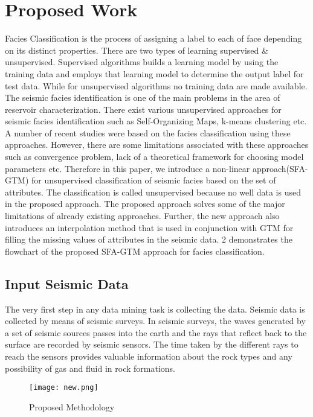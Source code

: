 \documentclass[a4paper]{article}
\begin{document}
\section{Proposed Work}
Facies Classification is the process of assigning a label to each of face depending on its distinct properties. There are two types of learning\cite{ml} supervised \& unsupervised. Supervised algorithms\cite{ml} builds a learning model by using the training data and employs that learning model to determine the output label for test data. While for unsupervised algorithms\cite{ml} no training data are made available. The seismic facies identification is one of the main problems in the area of reservoir characterization. There exist various unsupervised approaches for seismic facies identification such as Self-Organizing Maps, k-means clustering etc. A number of recent studies were based on the facies classification using these approaches. However, there are some limitations associated with these approaches such as convergence problem, lack of a theoretical framework for choosing model parameters etc. Therefore in this paper, we introduce a non-linear approach(SFA-GTM) for unsupervised classification of seismic facies based on the set of attributes. The classification is called unsupervised because no well data is used in the proposed approach. The proposed approach solves some of the major limitations of already existing approaches. Further, the new approach also introduces an interpolation method that is used in conjunction with GTM for filling the missing values of attributes in the seismic data. \figurename{2} demonstrates the flowchart of the proposed SFA-GTM approach for facies classification.
\subsection{Input Seismic Data}
The very first step in any data mining task is collecting the data. Seismic data is collected by means of seismic surveys\cite{bookseismic}.
In seismic surveys, the waves generated by a set of seismic sources passes into the earth and the rays that reflect back to the surface are recorded by seismic sensors. The time taken by the different rays to reach the sensors provides valuable information about the rock types and any possibility of gas and fluid in rock formations\cite{bookseismic}.
\begin{figure}[htbp]
\centering
\texttt{[image: new.png]}
\label{An Example of Non-Linear Transformation from Data Space(3-Dimensions) to Latent Space(2-Dimensions)}
\caption{Proposed Methodology}
\end{figure} 
\end{document}
